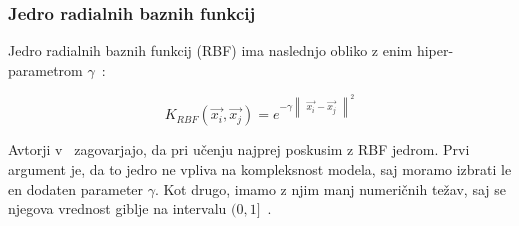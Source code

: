 \subsubsection{Jedro radialnih baznih funkcij}{
Jedro radialnih baznih funkcij (RBF) ima naslednjo obliko z enim hiper-parametrom $\gamma$~\cite{hsu2003practical}:

\begin{equation} \label{eq:rbf-kernel}
		K_{RBF}(\vec{x_i}, \vec{x_j}) = e^{
        	-\gamma 
        	\begin{Vmatrix}
        		\vec{x_i} - \vec{x_j}
        	\end{Vmatrix}^2
        }
\end{equation}

Avtorji v~\cite{hsu2003practical} zagovarjajo, da pri učenju najprej poskusim z RBF jedrom. Prvi argument je, da to jedro ne vpliva na kompleksnost modela, saj moramo izbrati le en dodaten parameter $\gamma$. Kot drugo, imamo z njim manj numeričnih težav, saj se njegova vrednost giblje na intervalu $(0, 1]$~\cite{hsu2003practical}. 


\begin{comment}
\subsubsection{Jedro preseka generaliziranih histogramov}\label{sec:ghi}
Jedro preseka generaliziranih histogramov (GHI) je uporaben, ko imamo deskriptorje definirane kot histograme. Določen z enačbo~\eqref{eq:ghi-kernel}, kjer je hiper-parameter $\beta \geq 0$, $m$ pa je število stolpcev histogramov $\vec{x}$ in $\vec{x}'$~\cite{boughorbel2005generalized}.

\begin{equation}\label{eq:ghi-kernel}
K_{GHI}(\vec{x}, \vec{x}') = \sum_{i=1}^m min\left\{ \left| x_i \right|^\beta, \left|  x_i' \right| \right\}
\end{equation}

Po~\cite{boughorbel2005generalized} je prednost uporabe GHI jedra ta, da so meje invariantne na skaliranje prostora značilk, zato ne potrebujemo dodatne optimizacije skalirnega hiper-parametra. Optimalna vrednosti hiper-parametra je okoli $\beta=0.25$.

\end{comment}





}
